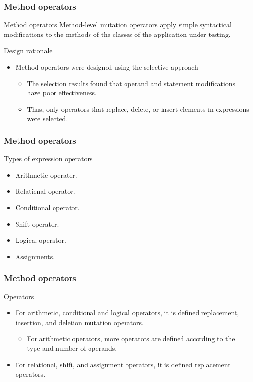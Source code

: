 \begin{frame}[parent={concept:mujava}, hasprev=false, hasnext=true]
\frametitle{Method operators}

\begin{block:concept}{Method operators}
Method-level mutation operators apply simple syntactical modifications to the
methods of the classes of the application under testing.
\end{block:concept}

\begin{block:fact}{Design rationale}
\begin{itemize}
	\item Method operators were designed using the selective approach.
	\begin{itemize}
		\item The selection results found that operand and statement
		modifications have poor effectiveness.

		\item Thus, only operators that replace, delete, or insert elements in
		expressions were selected.
	\end{itemize}
\end{itemize}
\end{block:fact}
\end{frame}



\begin{frame}[hasprev=true, hasnext=false]
\frametitle{Method operators}

\begin{block:fact}{Types of expression operators}
\begin{itemize}
	\item Arithmetic operator.
	\item Relational operator.
	\item Conditional operator.
	\item Shift operator.
	\item Logical operator.
	\item Assignments.
\end{itemize}
\end{block:fact}
\end{frame}


\begin{frame}[hasprev=true, hasnext=false]
\frametitle{Method operators}

\begin{block:fact}{Operators}
\begin{itemize}
	\item For arithmetic, conditional and logical operators, it is defined
	replacement, insertion, and deletion mutation operators.
	\begin{itemize}
		\item For arithmetic operators, more operators are defined according
		to the type and number of operands.
	\end{itemize}

	\item For relational, shift, and assignment operators, it is defined
	replacement operators.
\end{itemize}
\end{block:fact}
\end{frame}